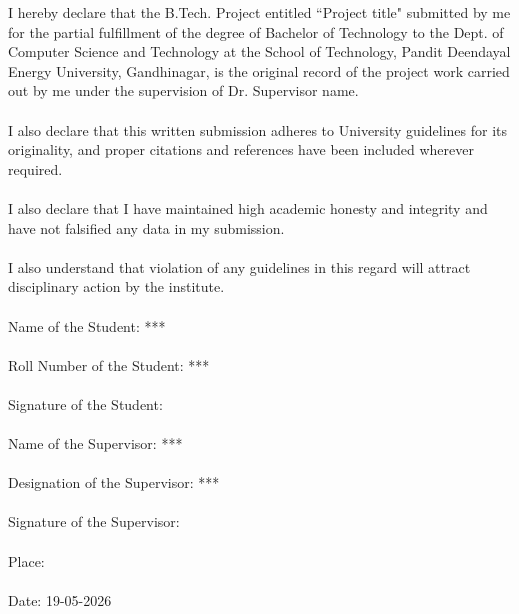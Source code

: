 I hereby declare that the B.Tech. Project entitled ``Project title" submitted by me for the partial fulfillment of the degree of Bachelor of Technology to the Dept. of Computer Science and Technology at the School of Technology, Pandit Deendayal Energy University, Gandhinagar, is the original record of the project work carried out by me under the supervision of Dr. Supervisor name.\\
\\
I also declare that this written submission adheres to University guidelines for its originality, and proper citations and references have been included wherever required.\\
\\
I also declare that I have maintained high academic honesty and integrity and have not falsified any data in my submission.\\
\\
I also understand that violation of any guidelines in this regard will attract disciplinary action by the institute.\\
\\
Name of the Student: ***\\
\\
Roll Number of the Student: ***\\
\\
Signature of the Student: \\
\\
Name of the Supervisor: *** \\
\\
Designation of the Supervisor: *** \\
\\
Signature of the Supervisor: \\
\\
Place: \\
\\
Date: 19-05-2026


